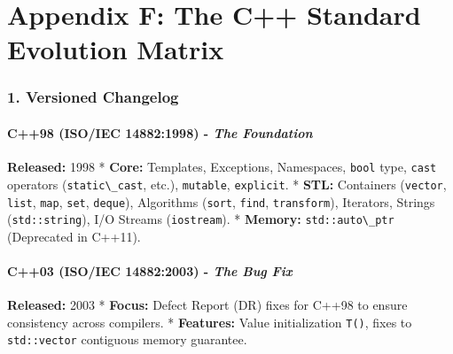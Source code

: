 \hypertarget{appendix-f-the-c-standard-evolution-matrix}{%
\chapter{Appendix F: The C++ Standard Evolution
Matrix}\label{appendix-f-the-c-standard-evolution-matrix}}

\hypertarget{versioned-changelog}{%
\subsection{1. Versioned Changelog}\label{versioned-changelog}}

\hypertarget{c98-isoiec-148821998---the-foundation}{%
\subsubsection{\texorpdfstring{\textbf{C++98 (ISO/IEC 14882:1998)} -
\emph{The
Foundation}}{C++98 (ISO/IEC 14882:1998) - The Foundation}}\label{c98-isoiec-148821998---the-foundation}}

\textbf{Released:} 1998 * \textbf{Core:} Templates, Exceptions,
Namespaces, \passthrough{\lstinline!bool!} type,
\passthrough{\lstinline!cast!} operators
(\passthrough{\lstinline!static\_cast!}, etc.),
\passthrough{\lstinline!mutable!}, \passthrough{\lstinline!explicit!}. *
\textbf{STL:} Containers (\passthrough{\lstinline!vector!},
\passthrough{\lstinline!list!}, \passthrough{\lstinline!map!},
\passthrough{\lstinline!set!}, \passthrough{\lstinline!deque!}),
Algorithms (\passthrough{\lstinline!sort!},
\passthrough{\lstinline!find!}, \passthrough{\lstinline!transform!}),
Iterators, Strings (\passthrough{\lstinline!std::string!}), I/O Streams
(\passthrough{\lstinline!iostream!}). * \textbf{Memory:}
\passthrough{\lstinline!std::auto\_ptr!} (Deprecated in C++11).

\hypertarget{c03-isoiec-148822003---the-bug-fix}{%
\subsubsection{\texorpdfstring{\textbf{C++03 (ISO/IEC 14882:2003)} -
\emph{The Bug
Fix}}{C++03 (ISO/IEC 14882:2003) - The Bug Fix}}\label{c03-isoiec-148822003---the-bug-fix}}

\textbf{Released:} 2003 * \textbf{Focus:} Defect Report (DR) fixes for
C++98 to ensure consistency across compilers. * \textbf{Features:} Value
initialization \passthrough{\lstinline!T()!}, fixes to
\passthrough{\lstinline!std::vector!} contiguous memory guarantee.

